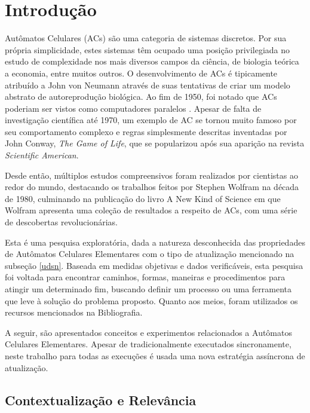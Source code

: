 \documentclass[a4paper,12pt]{ltxdoc}
\newcommand\tab[1][1cm]{\hspace*{#1}}
\begin{document}
\renewcommand{\contentsname}{\centerline{\Large Sumário}}

\section{Introdução}

Autômatos Celulares (ACs) são uma categoria de sistemas discretos. Por sua própria simplicidade, estes sistemas têm ocupado uma posição privilegiada no estudo de complexidade nos mais diversos campos da ciência, de biologia teórica a economia, entre muitos outros. O desenvolvimento de ACs é tipicamente atribuído a John von Neumann através de suas tentativas de criar um modelo abstrato de autoreprodução biológica. Ao fim de 1950, foi notado que ACs poderiam ser vistos como computadores paralelos \cite[p. 876]{wolfram2002new}. Apesar de falta de investigação científica até 1970, um exemplo de AC se tornou muito famoso por seu comportamento complexo e regras simplesmente descritas inventadas por John Conway, \textit{The Game of Life}, que se popularizou após sua aparição na revista \textit{Scientific American}. 

\tab Desde então, múltiplos estudos compreensivos foram realizados por cientistas ao redor do mundo, destacando os trabalhos feitos por Stephen Wolfram na década de 1980, culminando na publicação do livro A New Kind of Science em que Wolfram apresenta uma coleção de resultados a respeito de ACs, com uma série de descobertas revolucionárias. 

\tab Esta é uma pesquisa exploratória, dada a natureza desconhecida das propriedades de Autômatos Celulares Elementares com o tipo de atualização mencionado na subseção \ref{udsn}. Baseada em medidas objetivas e dados verificáveis, esta pesquisa foi voltada para encontrar caminhos, formas, maneiras e procedimentos para atingir um determinado fim, buscando definir um processo ou uma ferramenta que leve à solução do problema proposto. Quanto aos meios, foram utilizados os recursos mencionados na Bibliografia.

\tab A seguir, são apresentados conceitos e experimentos relacionados a Autômatos Celulares Elementares. Apesar de tradicionalmente executados sincronamente, neste trabalho para todas as execuções é usada uma nova estratégia assíncrona de atualização.

\subsection{Contextualização e Relevância} \label{contex}
\end{document}
